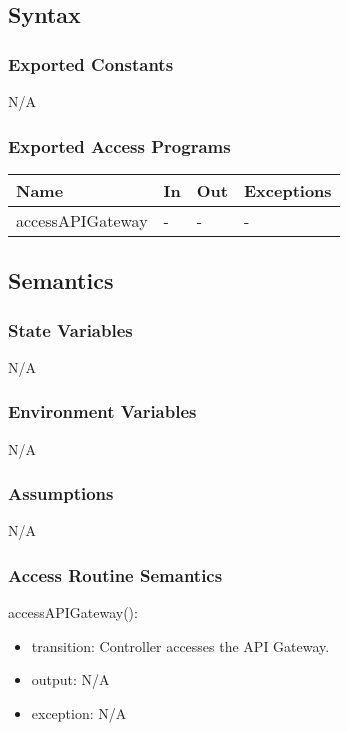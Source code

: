 \documentclass[12pt, titlepage]{article}
\begin{document}
\subsection{Syntax}

\subsubsection{Exported Constants}

N/A

\subsubsection{Exported Access Programs}

\begin{center}
\begin{tabular}{p{8cm} p{4cm} p{2cm} p{2cm}}
\hline
\textbf{Name} & \textbf{In} & \textbf{Out} & \textbf{Exceptions} \\
\hline
accessAPIGateway & - & - & - \\
\hline
\end{tabular}
\end{center}

\subsection{Semantics}

\subsubsection{State Variables}
N/A

\subsubsection{Environment Variables}
N/A

\subsubsection{Assumptions}
N/A

\subsubsection{Access Routine Semantics}

\noindent accessAPIGateway():
\begin{itemize}
\item transition: Controller accesses the API Gateway.
\item output: N/A
\item exception: N/A
\end{itemize}
\end{document}
